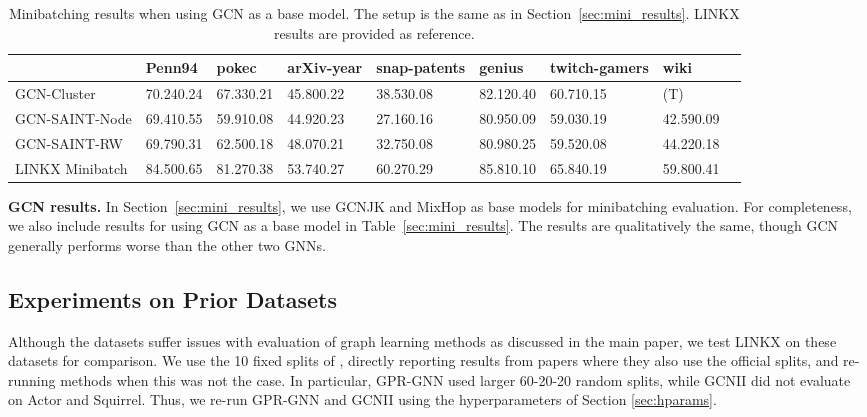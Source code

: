 \documentclass{article}
\newcommand{\bestcell}{\cellcolor{blue!25}}
\newcommand{\myparagraph}[1]{\noindent \textbf{#1}}
\begin{document}
\begin{table}[ht]
    \vspace{-5pt}
    \centering
	\caption{Minibatching results when using GCN as a base model. The setup is the same as in Section~\ref{sec:mini_results}. LINKX results are provided as reference.}
	\label{tab:gcn_results}
    {\tiny
    \begin{tabular}{lllllllll}
    \toprule
	 & Penn94 & pokec  & arXiv-year & snap-patents  & genius  & twitch-gamers  & wiki   \\
    \midrule
	GCN-Cluster &  70.240.24 & 67.330.21 & 45.800.22 & 38.530.08 & 82.120.40 & 60.710.15 & (T) \\
	GCN-SAINT-Node & 69.410.55 & 59.910.08 & 44.920.23 & 27.160.16 & 80.950.09 & 59.030.19 & 42.590.09 \\
	GCN-SAINT-RW & 69.790.31 & 62.500.18 & 48.070.21 & 32.750.08 & 80.980.25 & 59.520.08 & 44.220.18 \\
	 \midrule
	LINKX Minibatch & \bestcell 84.500.65 & \bestcell 81.270.38 & \bestcell 53.740.27 & \bestcell 60.270.29 & \bestcell 85.810.10 & \bestcell 65.840.19 & \bestcell 59.800.41 \\
	 \bottomrule
    \end{tabular}
    }
\end{table}

\myparagraph{GCN results.} In Section~\ref{sec:mini_results}, we use GCNJK and MixHop as base models for minibatching evaluation. For completeness, we also include results for using GCN as a base model in Table~\ref{sec:mini_results}. The results are qualitatively the same, though GCN generally performs worse than the other two GNNs.



\subsection{Experiments on Prior Datasets}\label{sec:prior_datasets}

Although the \citet{pei2019geom} datasets suffer issues with evaluation of graph learning methods as discussed in the main paper, we test LINKX on these datasets for comparison. We use the 10 fixed splits of \cite{pei2019geom}, directly reporting results from papers where they also use the official splits, and re-running methods when this was not the case. In particular, GPR-GNN used larger 60-20-20 random splits, while GCNII did not evaluate on Actor and Squirrel. Thus, we re-run GPR-GNN and GCNII using the hyperparameters of Section \ref{sec:hparams}.
\end{document}
